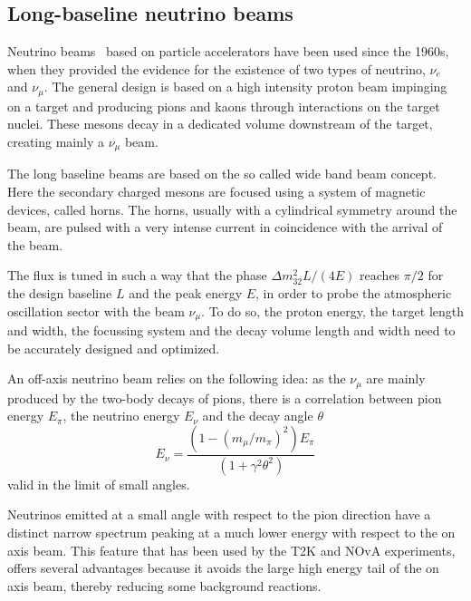 \subsection{Long-baseline neutrino beams }

Neutrino beams~\cite{Kopp2007101} based on particle accelerators have been used since the 1960s, when they provided the evidence for the existence of two types of neutrino, $\nu_e$ and $\nu_\mu$. The general design is based on a high intensity proton beam impinging on a target and producing pions and kaons through interactions on the target nuclei. 
These mesons decay in a dedicated volume downstream of the target, creating mainly a $\nu_\mu$ beam.  

The long baseline beams are based on the so called wide band beam concept. Here the secondary charged mesons are focused using a system of magnetic devices, called horns. The horns, usually with a cylindrical symmetry around the beam, are pulsed with a very intense current in coincidence with the arrival of the beam. 

The flux is tuned in such a way that the phase $\Delta m^2_{32} L/ (4 E)$ reaches $\pi/2$ for the design baseline $L$ and the peak energy $E$, in order to probe the atmospheric oscillation sector with the beam $\nu_\mu$. To do so, the proton energy, the target length and width, the focussing system and the decay volume length and width need to be accurately designed and optimized.   

An off-axis neutrino beam \cite{1995bnl} relies on the following idea: as the $\nu_\mu$ are mainly produced by the two-body decays of pions, there is a correlation between pion energy $E_\pi$, the neutrino energy $E_\nu$ and the decay angle $\theta$ 
\begin{equation}
E_\nu = \frac{(1-(m_\mu/m_\pi)^2) E_\pi}{(1+\gamma^2 \theta^2) } 
\end{equation}
valid in the limit of small angles.

Neutrinos emitted at a small angle with respect to the pion direction have a distinct narrow spectrum peaking at a much lower energy with respect to the on axis beam. This feature that has been used by the T2K and NOvA experiments, offers several advantages because it avoids the large high energy tail of the on axis beam, thereby reducing some background reactions. 

